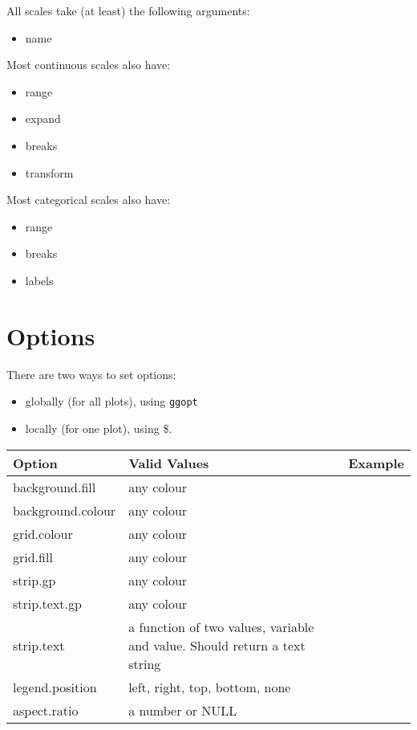 All scales take (at least) the following arguments:

\begin{itemize}
  \item name
\end{itemize}

Most continuous scales also have:

\begin{itemize}
  \item range
  \item expand
  \item breaks
  \item transform
\end{itemize}

Most categorical scales also have:

\begin{itemize}
  \item range
  \item breaks
  \item labels
\end{itemize}
\section{Options}\label{sec:options}

There are two ways to set options:

\begin{itemize}
  \item globally (for all plots), using {\tt ggopt}
  \item locally (for one plot), using \$. 
\end{itemize}     
                 
\begin{tabular}{lp{1.5in}l}
Option & Valid Values & Example \\
\hline
background.fill    & any colour
& \\
background.colour  & any colour
& \\
grid.colour        & any colour
& \\
grid.fill          & any colour
& \\
strip.gp           & any colour
& \\
strip.text.gp      & any colour
& \\
strip.text         & a function of two values, variable and value.  Should return a text string
& \\
legend.position    & left, right, top, bottom, none
& \\
aspect.ratio       & a number or NULL
& \\
\hline
\end{tabular}

